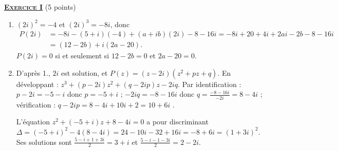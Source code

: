 \providecommand{\Courbe}{(\mathscr{C})}
\providecommand{\cm}{~\mathrm{cm}}
\providecommand{\dx}{~\mathrm{d}x}
%
\noindent \underline{\textsc{\textbf{Exercice I}}} (5 points)
	\begin{enumerate}
		\item {}
			$(2i)^2 = -4$ et $(2i)^3 = -8i$, donc
			\begin{align*}
				P(2i) &= -8i - (5+i)(-4) + (a+ib)(2i) - 8 - 16i
				       = -8i + 20 + 4i + 2ai - 2b - 8 - 16i \\
				      &= (12 - 2b) + i(2a - 20).
			\end{align*}
			$P(2i) = 0$ si et seulement si $12 - 2b = 0$ et $2a - 20 = 0$.

		\item {}
			D'après 1., $2i$ est solution, et $P(z) = (z - 2i)(z^2 + pz + q)$.
			En développant : $z^3 + (p - 2i)z^2 + (q - 2ip)z - 2iq$.
			Par identification : $p - 2i = -5 - i$ donc $p = -5 + i$ ; $-2iq = -8 - 16i$ donc $q = \frac{-8-16i}{-2i} = 8 - 4i$ ;
			vérification : $q - 2ip = 8 - 4i + 10i + 2 = 10 + 6i$ \checkmark.

			L'équation $z^2 + (-5+i)z + 8 - 4i = 0$ a pour discriminant
			$\Delta = (-5+i)^2 - 4(8-4i) = 24 - 10i - 32 + 16i = -8 + 6i = (1 + 3i)^2$.
			Ses solutions sont $\frac{5 - i + 1 + 3i}{2} = 3 + i$ et $\frac{5 - i - 1 - 3i}{2} = 2 - 2i$.


\end{enumerate}
